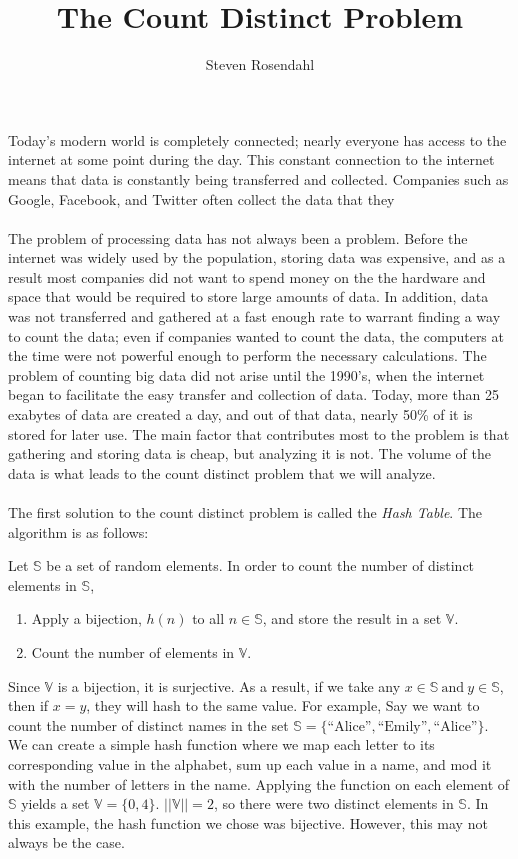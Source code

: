 \documentclass{article}
\title{The Count Distinct Problem}
\author{Steven Rosendahl}
\date{}
\begin{document}
\maketitle
\indent Today's modern world is completely connected; nearly everyone has access to the internet at some point 
during the day. This constant connection to the internet means that data is constantly being transferred and 
collected. Companies such as Google, Facebook, and Twitter often collect the data that they
\\\\
\indent The problem of processing data has not always been a problem. Before the internet was widely used by
the population, storing data was expensive, and as a result most companies did not want to spend money on the 
the hardware and space that would be required to store large amounts of data. In addition, data was not 
transferred and gathered at a fast enough rate to warrant finding a way to count the data; even if companies wanted to count the data, the computers at the time were not powerful enough to perform the necessary calculations. The problem of counting big data did not arise until the 1990's, when the internet began to facilitate the easy transfer and collection of data. Today, more than 25 exabytes of data are created a day, and out of that data, nearly 50\% of it is stored for later use. The main factor that contributes most to the problem is that gathering and storing data is cheap, but analyzing it is not. The volume of the data is what leads to the count distinct problem that we will analyze.
\\\\
\indent The first solution to the count distinct problem is called the \textit{Hash Table}. The algorithm is as follows:
\begin{center}
Let $\mathbb{S}$ be a set of random elements. In order to count the number of distinct elements in $\mathbb{S}$,
\begin{enumerate}
\item Apply a bijection, $h(n)$ to all $n\in\mathbb{S}$, and store the result in a set $\mathbb{V}$.
\item Count the number of elements in $\mathbb{V}$.
\end{enumerate}
\end{center}
Since $\mathbb{V}$ is a bijection, it is surjective. As a result, if we take any $x\in\mathbb{S}\ \text{and}\ y\in\mathbb{S}$, then if $x = y$, they will hash to the same value. For example, Say we want to count the number of distinct names in the set $\mathbb{S} = \{\text{``Alice''},\text{``Emily''},\text{``Alice''}\}$. We can create a simple hash function where we map each letter to its corresponding value in the alphabet, sum up each value in a name, and mod it with the number of letters in the name. Applying the function on each element of $\mathbb{S}$ yields a set $\mathbb{V} = \{0,4\}$. $||\mathbb{V}|| = 2$, so there were two distinct elements in $\mathbb{S}$. In this example, the hash function we chose was bijective. However, this may not always be the case.
\end{document}
